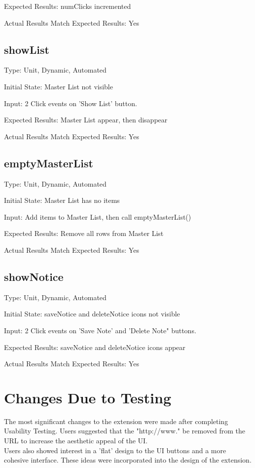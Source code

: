 \documentclass[12pt, titlepage]{article}
\begin{document}
	Expected Results: numClicks incremented

	Actual Results Match Expected Results: Yes
	
\subsection{showList}

	Type: Unit, Dynamic, Automated

	Initial State: Master List not visible

	Input: 2 Click events on 'Show List' button.

	Expected Results: Master List appear, then disappear

	Actual Results Match Expected Results: Yes

\subsection{emptyMasterList}

	Type: Unit, Dynamic, Automated

	Initial State: Master List has no items

	Input: Add items to Master List, then call emptyMasterList()

	Expected Results: Remove all rows from Master List 

	Actual Results Match Expected Results: Yes

\subsection{showNotice}

	Type: Unit, Dynamic, Automated

	Initial State: saveNotice and deleteNotice icons not visible

	Input: 2 Click events on 'Save Note' and 'Delete Note" buttons.

	Expected Results: saveNotice and deleteNotice icons appear

	Actual Results Match Expected Results: Yes

\section{Changes Due to Testing}
		
	The most significant changes to the extension were made after completing 
	Usability Testing. Users suggested that the "http://www." be removed from 
	the URL to increase the aesthetic appeal of the UI.\\
	Users also showed interest in a 'flat' design to the UI buttons and a more 
	cohesive interface. These ideas were incorporated into the design of the 
	extension.
		
\end{document}
